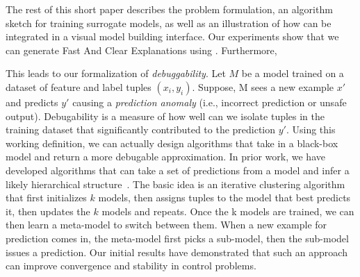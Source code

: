 The rest of this short paper describes the \sys problem formulation, an algorithm sketch for training surrogate models, as well as an illustration of how \sys can be integrated in a visual model building interface.
Our experiments show that we can generate Fast And Clear Explanations using \sys.
Furthermore, 


This leads to our formalization of \emph{debuggability}.
Let $M$ be a model trained on a dataset of feature and label tuples $(x_i,y_i)$.
Suppose, M sees a new example $x'$ and predicts $y'$ causing a \emph{prediction anomaly} (i.e., incorrect prediction or unsafe output).
Debugability is a measure of how well can we isolate tuples in the training dataset that significantly contributed to the prediction $y'$.
Using this working definition, we can actually design algorithms that take in a black-box model and return a more debugable approximation.
In prior work, we have developed algorithms that can take a set of predictions from a model and infer a likely hierarchical structure~\cite{DBLP:journals/corr/KrishnanGLMPG16, Krishnan17}.
The basic idea is an iterative clustering algorithm that first initializes $k$ models, then assigns tuples to the model that best predicts it, then updates the $k$ models and repeats.
Once the k models are trained, we can then learn a meta-model to switch between them.
When a new example for prediction comes in, the meta-model first picks a sub-model, then the sub-model issues a prediction.
Our initial results have demonstrated that such an approach can improve convergence and stability in control problems.
\fi




























